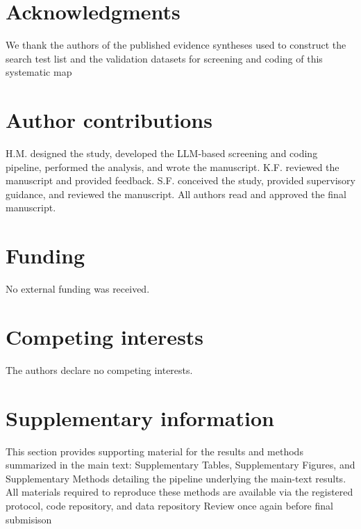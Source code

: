\documentclass[12pt]{article}
\newcommand{\TODO}[1]{{\color{red}#1}}
\begin{document}
\vspace{0.4cm}

\newpage

\newpage

\section*{Acknowledgments}
We thank the authors of the published evidence syntheses used to construct the search test list and the validation datasets for screening and coding of this systematic map
\vspace{0.4cm}

\section*{Author contributions}
H.M. designed the study, developed the LLM-based screening and coding pipeline, performed the analysis, and wrote the manuscript. K.F. reviewed the manuscript and provided feedback. S.F. conceived the study, provided supervisory guidance, and reviewed the manuscript. All authors read and approved the final manuscript.
\vspace{0.4cm}

\section*{Funding} 
No external funding was received.
\vspace{0.4cm}

\section*{Competing interests}
The authors declare no competing interests.

\newpage


\appendix
\section*{Supplementary information}
\setcounter{table}{0}
\setcounter{figure}{0}
\renewcommand{\thetable}{S\arabic{table}}
\renewcommand{\thefigure}{S\arabic{figure}}
\renewcommand{\tablename}{Supplementary Table}
\renewcommand{\figurename}{Supplementary Figure}
This section provides supporting material for the results and methods summarized in the main text: Supplementary Tables, Supplementary Figures, and Supplementary Methods detailing the pipeline underlying the main-text results. All materials required to reproduce these methods are available via the registered protocol, code repository, and data repository
\TODO{Review once again before final submisison}
\end{document}
